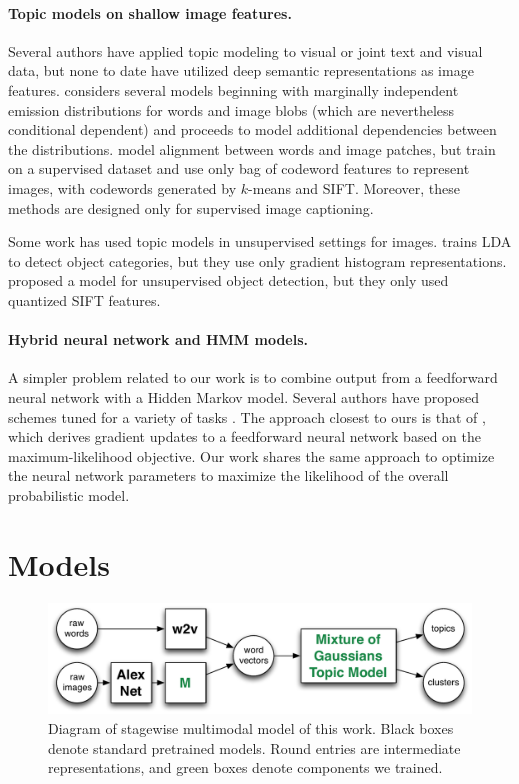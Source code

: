 \documentclass[11pt]{article}
\begin{document}
\paragraph{Topic models on shallow image features.}
Several authors have applied topic modeling to visual or joint text and visual data, but none to date have utilized deep semantic representations as image features. \cite{Barnard03} considers several models beginning with marginally independent emission distributions for words and image blobs (which are nevertheless conditional dependent) and proceeds to model additional dependencies between the distributions. \cite{Wang09} model alignment between words and image patches, but train on a supervised dataset and use only bag of codeword features to represent images, with codewords generated by $k$-means and SIFT. Moreover, these methods are designed only for supervised image captioning.

Some work has used topic models in unsupervised settings for images. \cite{Fritz08} trains LDA to detect object categories, but they use only gradient histogram representations. \cite{Cao07} proposed a model for unsupervised object detection, but they only used quantized SIFT features.

\paragraph{Hybrid neural network and HMM models.}
A simpler problem related to our work is to combine output from a feedforward neural network with a Hidden Markov model. Several authors have proposed schemes tuned for a variety of tasks \cite{Trentin01}. The approach closest to ours is that of \cite{Bengio92}, which derives gradient updates to a feedforward neural network based on the maximum-likelihood objective. Our work shares the same approach to optimize the neural network parameters to maximize the likelihood of the overall probabilistic model.

\section{Models}
\begin{figure}
\centering
\includegraphics[width=\columnwidth]{assets/stagewise_model.pdf}
\caption{Diagram of stagewise multimodal model of this work. Black boxes denote standard pretrained models. Round entries are intermediate representations, and green boxes denote components we trained.}
\end{figure}
\end{document}

